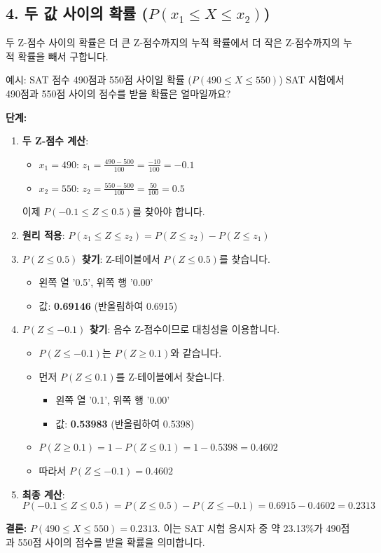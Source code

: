 \documentclass[11pt,a4paper]{article}
\begin{document}
\subsection*{4. 두 값 사이의 확률 ($P(x_1 \le X \le x_2)$)}
두 Z-점수 사이의 확률은 더 큰 Z-점수까지의 누적 확률에서 더 작은 Z-점수까지의 누적 확률을 빼서 구합니다.

\begin{examplebox}{예시: SAT 점수 490점과 550점 사이일 확률 ($P(490 \le X \le 550)$)}
SAT 시험에서 490점과 550점 사이의 점수를 받을 확률은 얼마일까요?

\textbf{단계:}
\begin{enumerate}
    \item \textbf{두 Z-점수 계산}:
    \begin{itemize}
        \item $x_1 = 490$: $z_1 = \frac{490 - 500}{100} = \frac{-10}{100} = -0.1$
        \item $x_2 = 550$: $z_2 = \frac{550 - 500}{100} = \frac{50}{100} = 0.5$
    \end{itemize}
    이제 $P(-0.1 \le Z \le 0.5)$를 찾아야 합니다.
    \item \textbf{원리 적용}: $P(z_1 \le Z \le z_2) = P(Z \le z_2) - P(Z \le z_1)$
    \item \textbf{$P(Z \le 0.5)$ 찾기}: Z-테이블에서 $P(Z \le 0.5)$를 찾습니다.
    \begin{itemize}
        \item 왼쪽 열 '0.5', 위쪽 행 '0.00'
        \item 값: \textbf{0.69146} (반올림하여 0.6915)
    \end{itemize}
    \item \textbf{$P(Z \le -0.1)$ 찾기}: 음수 Z-점수이므로 대칭성을 이용합니다.
    \begin{itemize}
        \item $P(Z \le -0.1)$는 $P(Z \ge 0.1)$와 같습니다.
        \item 먼저 $P(Z \le 0.1)$를 Z-테이블에서 찾습니다.
            \begin{itemize}
                \item 왼쪽 열 '0.1', 위쪽 행 '0.00'
                \item 값: \textbf{0.53983} (반올림하여 0.5398)
            \end{itemize}
        \item $P(Z \ge 0.1) = 1 - P(Z \le 0.1) = 1 - 0.5398 = 0.4602$
        \item 따라서 $P(Z \le -0.1) = 0.4602$
    \end{itemize}
    \item \textbf{최종 계산}:
    \[ P(-0.1 \le Z \le 0.5) = P(Z \le 0.5) - P(Z \le -0.1) = 0.6915 - 0.4602 = 0.2313 \]
\end{enumerate}
\textbf{결론:} $P(490 \le X \le 550) = 0.2313$. 이는 SAT 시험 응시자 중 약 23.13\%가 490점과 550점 사이의 점수를 받을 확률을 의미합니다.


\end{examplebox}
\end{document}
